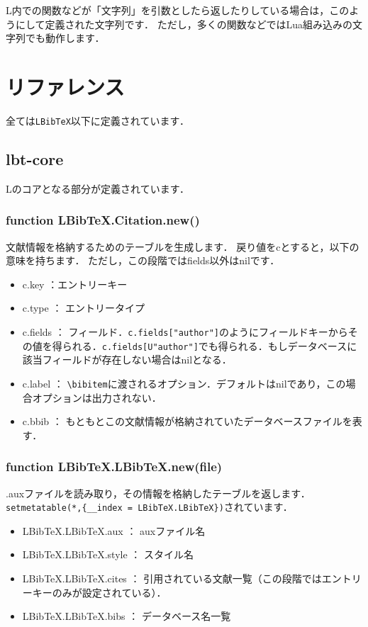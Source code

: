 \documentclass[dvipdfmx,a4paper]{jsarticle}
\DeclareRobustCommand{\LBibTeX}{L\BibTeX}
\begin{document}
\LBibTeX 内での関数などが「文字列」を引数としたら返したりしている場合は，このようにして定義された文字列です．
ただし，多くの関数などではLua組み込みの文字列でも動作します．

\section{リファレンス}
全ては\verb|LBibTeX|以下に定義されています．
\subsection{lbt-core}\label{subsec:lbt-core}
\LBibTeX のコアとなる部分が定義されています．
\subsubsection{function LBibTeX.Citation.new()}
文献情報を格納するためのテーブルを生成します．
戻り値をcとすると，以下の意味を持ちます．
ただし，この段階ではfields以外はnilです．
\begin{itemize}
\item c.key ：エントリーキー
\item c.type ： エントリータイプ
\item c.fields ： フィールド．\verb|c.fields["author"]|のようにフィールドキーからその値を得られる．\verb|c.fields[U"author"]|でも得られる．もしデータベースに該当フィールドが存在しない場合はnilとなる．
\item c.label ： \verb|\bibitem|に渡されるオプション．デフォルトはnilであり，この場合オプションは出力されない．
\item c.bbib ： もともとこの文献情報が格納されていたデータベースファイルを表す．
\end{itemize}

\subsubsection{function LBibTeX.LBibTeX.new(file)}
.auxファイルを読み取り，その情報を格納したテーブルを返します．\verb|setmetatable(*,{__index = LBibTeX.LBibTeX})|されています．
\begin{itemize}
\item LBibTeX.LBibTeX.aux ： auxファイル名
\item LBibTeX.LBibTeX.style ： スタイル名
\item LBibTeX.LBibTeX.cites ： 引用されている文献一覧（この段階ではエントリーキーのみが設定されている）．
\item LBibTeX.LBibTeX.bibs ： データベース名一覧
\end{itemize}
\end{document}
